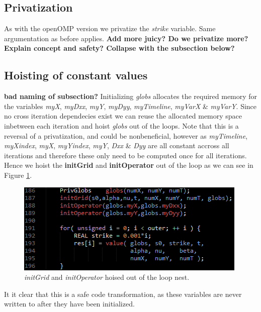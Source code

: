 \subsection{Privatization}
As with the openOMP version we privatize the \emph{strike} variable. Same
argumentation as before applies.
\textbf{Add more juicy? Do we privatize more? Explain concept and safety? Collapse with the subsection below?}

\subsection{Hoisting of constant values}
\textbf{bad naming of subsection?}
Initializing \emph{globs} allocates the required memory for the variables
\emph{myX}, \emph{myDxx}, \emph{myY}, \emph{myDyy}, \emph{myTimeline},
\emph{myVarX} \& \emph{myVarY}. Since no cross iteration dependecies exist we
can reuse the allocated memory space inbetween each iteration and hoist
\emph{globs} out of the loops. Note that this is a reversal of a privatization,
and could be nonbeneficial, however as \emph{myTimeline}, \emph{myXindex},
\emph{myX}, \emph{myYindex}, \emph{myY}, \emph{Dxx} \& \emph{Dyy} are all
constant accross all iterations and therefore these only need to be computed
once for all iterations. Hence we hoist the \textbf{initGrid} and
\textbf{initOperator} out of the loop as we can see in Figure
\ref{fig:globsinit}.

\begin{figure}[!ht]
\centering
\includegraphics[scale=1]{input/figures/globsinit.png}
\caption{\emph{initGrid} and \emph{initOperator} hoised out of the loop nest.\label{fig:globsinit}}
\end{figure}
 
It it clear that this is a safe code transformation, as these variables are
never written to after they have been initialized.
